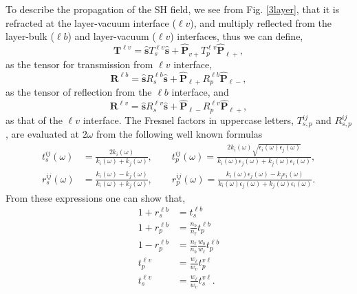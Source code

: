 \documentclass[10pt]{book}
\begin{document}
To describe the propagation of the SH field, we  see from
Fig. \ref{3layer}, that it is refracted at the 
layer-vacuum interface ($\ell v$), and multiply reflected from the
layer-bulk ($\ell b$)
and layer-vacuum ($\ell v$)
interfaces, thus we can define,
\begin{equation}\label{r5}
\mathbf{T}^{\ell v}
= \hat{\mathbf{s}}T_s^{\ell v}\hat{\mathbf{s}} 
+ \hat{\mathbf{P}}_{v+}T_{p}^{\ell v} \hat{\mathbf{P}}_{\ell +},
\end{equation}
as the tensor for transmission from $\ell v$ interface,
\begin{equation}\label{r6}
\mathbf{R}^{\ell b}
= \hat{\mathbf{s}}R_s^{\ell b}\hat{\mathbf{s}}
+ \hat{\mathbf{P}}_{\ell +}R_{p}^{\ell b} \hat{\mathbf{P}}_{\ell -},
\end{equation} 
as the tensor of reflection from the $\ell b$ interface, 
and
\begin{equation}\label{r6b}
\mathbf{R}^{\ell v}
= \hat{\mathbf{s}}R_s^{\ell v}\hat{\mathbf{s}}
+ \hat{\mathbf{P}}_{\ell -}R_{p}^{\ell v} \hat{\mathbf{P}}_{\ell +},
\end{equation} 
as that of the $\ell v$ interface. 
The Fresnel factors in uppercase letters, $T^{ij}_{s,p}$ and $R^{ij}_{s,p}$,
are evaluated at $2\omega$  from the following well known formulas 
\begin{equation}\label{e.f1}
\begin{split}
t_s^{ij}(\omega) &=
\frac{2k_{i}(\omega)}{k_{i}(\omega)+k_{j}(\omega)},
\quad\quad  
t_{p}^{ij}(\omega) =
\frac{2k_{i}(\omega)\sqrt{\epsilon_{i}(\omega)\epsilon_j(\omega)}}
     {k_{i}(\omega)\epsilon_{j}(\omega)+k_{j}(\omega)\epsilon_{i}(\omega)},\\
r_s^{ij}(\omega) &=
\frac{k_{i}(\omega) - k_{j}(\omega)}
     {k_{i}(\omega) + k_{j}(\omega)},
\quad\quad 
r_{p}^{ij}(\omega) =
\frac{k_{i}(\omega)\epsilon_{j}(\omega) - k_{j}\epsilon_{i}(\omega)}
     {k_{i}(\omega)\epsilon_{j}(\omega) + k_{j}(\omega)\epsilon_{i}(\omega)}. 
\end{split}
\end{equation}
From these expressions one can show that,
\begin{align}\label{mf}
1 + r^{\ell b}_{s} &= t^{\ell b}_{s}\nonumber\\
1 + r^{\ell b}_{p}
&= \frac{n_b}{n_\ell}
t^{\ell b}_{p} 
\nonumber\\
1 - r^{\ell b}_{p}
&= \frac{n_\ell}{n_b}
   \frac{w_{b}}{w_{\ell}}t^{\ell b}_{p}\\
t^{\ell v}_{p} &= \frac{w_{\ell}}{w_{v}}t^{v\ell}_{p}\nonumber\\
t^{\ell v}_{s} &= \frac{w_{\ell}}{w_{v}}t^{v\ell}_{s}\nonumber 
.
\end{align}
\end{document}
